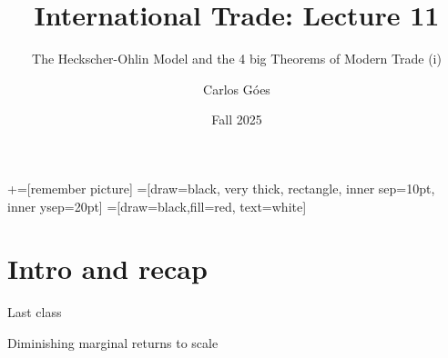 \documentclass[notes,11pt, aspectratio=169, xcolor=table]{beamer}
\title[]{International Trade: Lecture 11}
\subtitle[]{The Heckscher-Ohlin Model and the 4 big Theorems of Modern Trade (i)}
\author[Góes]
{Carlos Góes\inst{1}}
\date{Fall 2025}
\institute[GWU]{\inst{1} George Washington University }
\newenvironment{wideitemize}{\itemize\addtolength{\itemsep}{10pt}}{\enditemize}
\begin{document}
\newcommand\marktopleft[1]{%
    \tikz[overlay,remember picture] 
        \node (marker-#1-a) at (-.3em,.3em) {};%
}
\newcommand\markbottomright[2]{%
    \tikz[overlay,remember picture] 
        \node (marker-#1-b) at (0em,0em) {};%
}
+=[remember picture] 
 =[draw=black, very thick, rectangle, inner sep=10pt, inner ysep=20pt]
 =[draw=black,fill=red, text=white]















\frame{\titlepage}
\addtocounter{framenumber}{-1}




\section{Intro and recap}

\begin{frame}{Last class}
\begin{wideitemize}
    \item Diminishing marginal returns to scale
    \item 
\end{wideitemize}
\end{frame}
\end{document}
